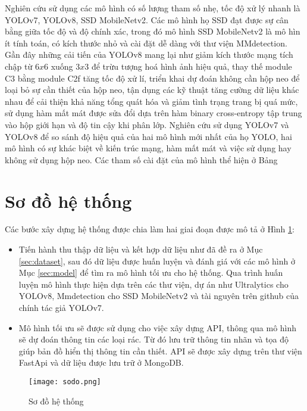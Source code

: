\documentclass[../the.tex]{subfiles}
\begin{document}
{\fontsize{13}{12} \selectfont

	Nghiên cứu sử dụng các mô hình có số lượng tham số nhẹ, tốc độ xử lý nhanh là YOLOv7, YOLOv8, SSD MobileNetv2.
	Các mô hình họ SSD đạt được sự cân bằng giữa tốc độ và độ chính xác, trong đó mô hình
	SSD MobileNetv2 là mô hìn ít tính toán, có kích thước nhỏ và cài đặt dễ dàng với thư viện MMdetection.
	Gần đây những cải tiến của YOLOv8 mang lại như giảm kích thước mạng tích chập từ $6x6$ xuống $3x3$ để trừu tượng hoá hình ảnh hiệu quả, thay thế module C3 bằng module C2f tăng tốc độ xử lí, triển khai dự đoán không cần hộp neo để loại bỏ sự cần thiết của hộp neo,
	tận dụng các kỹ thuật tăng cường dữ liệu khác nhau để cải thiện khả năng tổng quát hóa và giảm tình trạng trang bị quá mức, sử dụng hàm mất mát được sửa đổi dựa trên hàm binary cross-entropy tập trung vào hộp giới hạn và độ tin cậy khi phân lớp.
	Nghiên cứu sử dụng YOLOv7 và YOLOv8 để so sánh độ hiệu quả của hai mô hình mới nhất của họ YOLO, hai mô hình có sự khác biệt về kiến trúc mạng, hàm mất mát và việc sử dụng hay không sử dụng hộp neo.
	Các tham số cài đặt của mô hình thể hiện ở Bảng

}




\section{Sơ đồ hệ thống}
\label{sec:sodo}
{\fontsize{13}{12} \selectfont

	Các bước xây dựng hệ thống được chia làm hai giai đoạn được mô tả ở Hình \ref{fig:sodo}:

	\begin{itemize}
		\item Tiến hành thu thập dữ liệu và kết hợp dữ liệu như đã đề ra ở Mục \ref{sec:dataset}, sau đó dữ liệu được huấn luyện và đánh giá với các mô hình ở Mục \ref{sec:model} để tìm ra mô hình tối ưu cho hệ thống.
		      Qua trình huấn luyện mô hình thực hiện dựa trên các thư viện, dự án như Ultralytics cho YOLOv8, Mmdetection cho SSD MobileNetv2 và tài nguyên trên github của chính tác giả YOLOv7.
		\item Mô hình tối ưu sẽ được sử dụng cho việc xây dựng API, thông qua mô hình sẽ dự đoán thông tin các loại rác. Từ đó lưu trữ thông tin nhãn và tọa độ giúp bản đồ hiển thị thông tin cần thiết.
		      API sẽ được xây dựng trên thư viện FastApi và dữ liệu được lưu trữ ở MongoDB.
	\end{itemize}

}

\begin{figure}[H]
	\centering
	\texttt{[image: sodo.png]}
	\caption{Sơ đồ hệ thống}
	\label{fig:sodo}
\end{figure}
\end{document}
